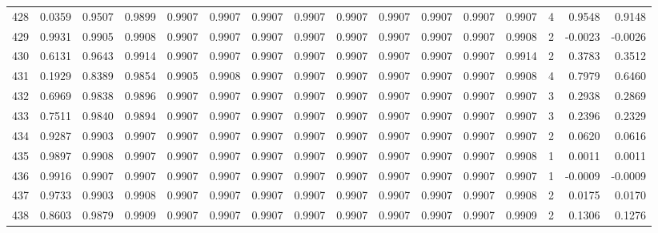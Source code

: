\begin{tabular}{lrrrrrrrrrrrrrrr}
428 &      0.0359 &  0.9507 &  0.9899 &  0.9907 &  0.9907 &  0.9907 &  0.9907 &  0.9907 &  0.9907 &  0.9907 &   0.9907 &     0.9907 &      4 &                    0.9548 &                     0.9148 \\
429 &      0.9931 &  0.9905 &  0.9908 &  0.9907 &  0.9907 &  0.9907 &  0.9907 &  0.9907 &  0.9907 &  0.9907 &   0.9907 &     0.9908 &      2 &                   -0.0023 &                    -0.0026 \\
430 &      0.6131 &  0.9643 &  0.9914 &  0.9907 &  0.9907 &  0.9907 &  0.9907 &  0.9907 &  0.9907 &  0.9907 &   0.9907 &     0.9914 &      2 &                    0.3783 &                     0.3512 \\
431 &      0.1929 &  0.8389 &  0.9854 &  0.9905 &  0.9908 &  0.9907 &  0.9907 &  0.9907 &  0.9907 &  0.9907 &   0.9907 &     0.9908 &      4 &                    0.7979 &                     0.6460 \\
432 &      0.6969 &  0.9838 &  0.9896 &  0.9907 &  0.9907 &  0.9907 &  0.9907 &  0.9907 &  0.9907 &  0.9907 &   0.9907 &     0.9907 &      3 &                    0.2938 &                     0.2869 \\
433 &      0.7511 &  0.9840 &  0.9894 &  0.9907 &  0.9907 &  0.9907 &  0.9907 &  0.9907 &  0.9907 &  0.9907 &   0.9907 &     0.9907 &      3 &                    0.2396 &                     0.2329 \\
434 &      0.9287 &  0.9903 &  0.9907 &  0.9907 &  0.9907 &  0.9907 &  0.9907 &  0.9907 &  0.9907 &  0.9907 &   0.9907 &     0.9907 &      2 &                    0.0620 &                     0.0616 \\
435 &      0.9897 &  0.9908 &  0.9907 &  0.9907 &  0.9907 &  0.9907 &  0.9907 &  0.9907 &  0.9907 &  0.9907 &   0.9907 &     0.9908 &      1 &                    0.0011 &                     0.0011 \\
436 &      0.9916 &  0.9907 &  0.9907 &  0.9907 &  0.9907 &  0.9907 &  0.9907 &  0.9907 &  0.9907 &  0.9907 &   0.9907 &     0.9907 &      1 &                   -0.0009 &                    -0.0009 \\
437 &      0.9733 &  0.9903 &  0.9908 &  0.9907 &  0.9907 &  0.9907 &  0.9907 &  0.9907 &  0.9907 &  0.9907 &   0.9907 &     0.9908 &      2 &                    0.0175 &                     0.0170 \\
438 &      0.8603 &  0.9879 &  0.9909 &  0.9907 &  0.9907 &  0.9907 &  0.9907 &  0.9907 &  0.9907 &  0.9907 &   0.9907 &     0.9909 &      2 &                    0.1306 &                     0.1276 \\

\end{tabular}
